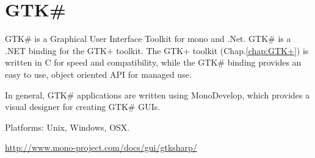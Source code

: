 \chapter{GTK\#}
\label{chap:GTKsharp}


GTK\# is a Graphical User Interface Toolkit for mono and .Net.
GTK\# is a .NET binding for the GTK+ toolkit. The GTK+ toolkit
(Chap.\ref{chap:GTK+}) is written in C for speed and compatibility, while the
GTK\# binding provides an easy to use, object oriented API for managed use. 

In general, GTK\# applications are written using MonoDevelop, which provides a
visual designer for creating GTK\# GUIs.

Platforms: Unix, Windows, OSX.

\url{http://www.mono-project.com/docs/gui/gtksharp/}

